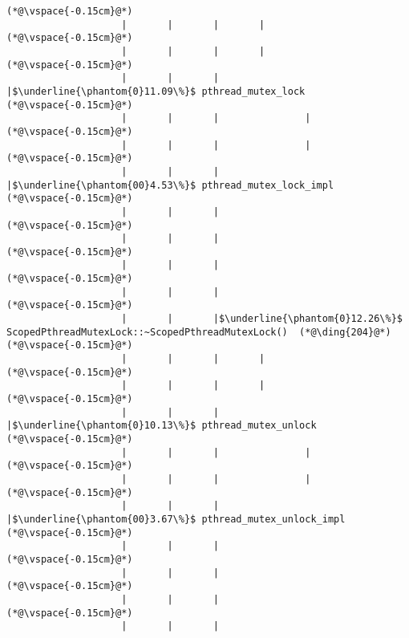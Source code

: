 \begin{lstlisting}[caption=Metodikutsu C$\to$Java 20 viiteparametrilla, label=profile:C2JBenchmark00206, numberbychapter=true, frame=lines, float, floatplacement=t]
(*@\vspace{-0.15cm}@*)
                    |       |       |       |
(*@\vspace{-0.15cm}@*)
                    |       |       |       |
(*@\vspace{-0.15cm}@*)
                    |       |       |       |$\underline{\phantom{0}11.09\%}$ pthread_mutex_lock
(*@\vspace{-0.15cm}@*)
                    |       |       |               |
(*@\vspace{-0.15cm}@*)
                    |       |       |               |
(*@\vspace{-0.15cm}@*)
                    |       |       |               |$\underline{\phantom{00}4.53\%}$ pthread_mutex_lock_impl
(*@\vspace{-0.15cm}@*)
                    |       |       |        
(*@\vspace{-0.15cm}@*)
                    |       |       |        
(*@\vspace{-0.15cm}@*)
                    |       |       |
(*@\vspace{-0.15cm}@*)
                    |       |       |
(*@\vspace{-0.15cm}@*)
                    |       |       |$\underline{\phantom{0}12.26\%}$ ScopedPthreadMutexLock::~ScopedPthreadMutexLock()  (*@\ding{204}@*)
(*@\vspace{-0.15cm}@*)
                    |       |       |       |
(*@\vspace{-0.15cm}@*)
                    |       |       |       |
(*@\vspace{-0.15cm}@*)
                    |       |       |       |$\underline{\phantom{0}10.13\%}$ pthread_mutex_unlock
(*@\vspace{-0.15cm}@*)
                    |       |       |               |
(*@\vspace{-0.15cm}@*)
                    |       |       |               |
(*@\vspace{-0.15cm}@*)
                    |       |       |               |$\underline{\phantom{00}3.67\%}$ pthread_mutex_unlock_impl
(*@\vspace{-0.15cm}@*)
                    |       |       |        
(*@\vspace{-0.15cm}@*)
                    |       |       |        
(*@\vspace{-0.15cm}@*)
                    |       |       |
(*@\vspace{-0.15cm}@*)
                    |       |       |

\end{lstlisting}
